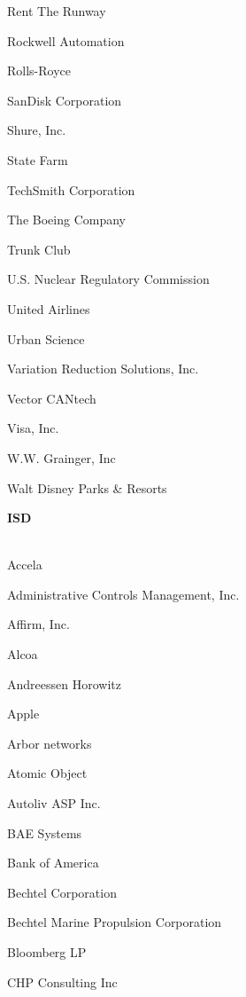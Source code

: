 \documentclass[twoside]{article}
\begin{document}
\begin{center}
\begin{multicols}{5}
\begin{FlushLeft}
\begin{compactitem}
\item Rent The Runway
\item Rockwell Automation
\item Rolls-Royce
\item SanDisk Corporation
\item Shure, Inc.
\item State Farm
\item TechSmith Corporation
\item The Boeing Company
\item Trunk Club
\item U.S. Nuclear Regulatory Commission
\item United Airlines
\item Urban Science
\item Variation Reduction Solutions, Inc.
\item Vector CANtech
\item Visa, Inc.
\item W.W. Grainger, Inc
\item Walt Disney Parks \& Resorts
\end{compactitem}
        \end{FlushLeft}
        \vspace{1em}
        {\fontsize{14}{16}\selectfont \bf ISD}\\
        \vspace{-1em}
        ~\hrulefill~
        \vspace{-.9em}
        \begin{FlushLeft}
        \begin{compactitem}
        \item Accela
\item Administrative Controls Management, Inc.
\item Affirm, Inc.
\item Alcoa
\item Andreessen Horowitz
\item Apple
\item Arbor networks
\item Atomic Object
\item Autoliv ASP Inc.
\item BAE Systems
\item Bank of America
\item Bechtel Corporation
\item Bechtel Marine Propulsion Corporation
\item Bloomberg LP
\item CHP Consulting Inc

\end{compactitem}
\end{FlushLeft}
\end{multicols}
\end{center}
\end{document}
